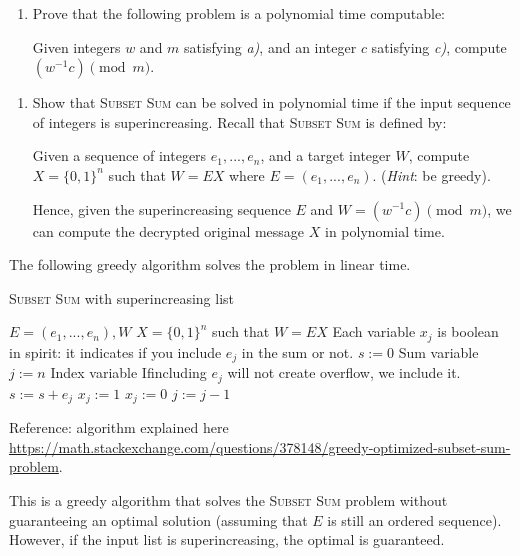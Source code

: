 \documentclass[a4paper]{article}
\begin{document}
\begin{enumerate}[resume, label=\roman*)]
	\item Prove that the following problem is a polynomial time computable:
	
	Given integers $w$ and $m$ satisfying \emph{a)}, and an integer $c$ satisfying \emph{c)}, compute $(w^{-1}c) \pmod{m}$.
\end{enumerate}

\begin{enumerate}[resume, label=\roman*)]
	\item Show that \textsc{Subset Sum} can be solved in polynomial time if the input sequence of integers is superincreasing. Recall that \textsc{Subset Sum} is defined by:
	
	Given a sequence of integers $e_1, ..., e_n$, and a target integer $W$, compute $X = \{0, 1\}^n$ such that $W = EX$ where $E = (e_1, ..., e_n)$. (\emph{Hint}: be greedy).
	
	Hence, given the superincreasing sequence $E$ and $W = (w^{-1}c) \pmod{m}$, we can compute the decrypted original message $X$ in polynomial time.
\end{enumerate}

The following greedy algorithm solves the problem in linear time.

\begin{algorithm}[H]
	\caption{\textsc{Subset Sum} with superincreasing list}
\begin{algorithmic}
	\INPUT $E= (e_1, ... , e_n), W $
	\OUTPUT $ X = \{0,1\}^n $ such that $W=EX$
	\State \Comment Each variable $x_j$ is boolean in spirit: it indicates if you include $e_j$ in the sum or not.
	\State $s := 0$ \Comment Sum variable
	\State $j := n$ \Comment Index variable
		 \Comment Ifincluding  $e_j$ will not create overflow, we include it.
			\State $s := s + e_j$
			\State $x_j := 1$
		\Else
			\State $x_j := 0$
		\EndIf
		$ j := j-1 $
	\EndWhile
\end{algorithmic}
\end{algorithm}

Reference: algorithm explained here \rightarrow \url{https://math.stackexchange.com/questions/378148/greedy-optimized-subset-sum-problem}.

This is a greedy algorithm that solves the \textsc{Subset Sum} problem without guaranteeing an optimal solution (assuming that $E$ is still an ordered sequence). However, if the input list is superincreasing, the optimal is guaranteed.
\end{document}
